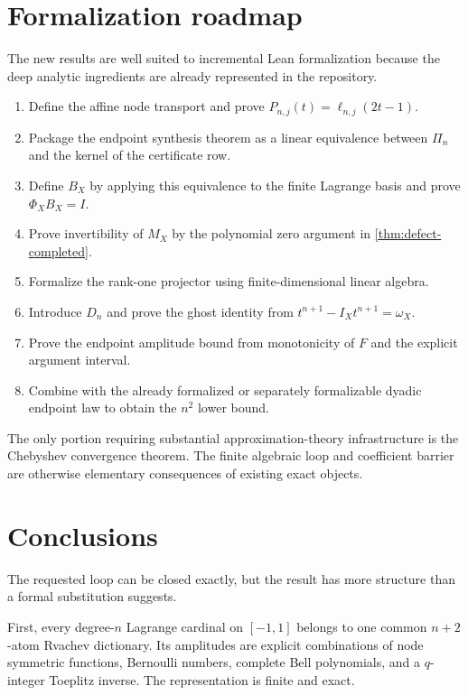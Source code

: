 \documentclass[11pt,oneside]{article}
\theoremstyle{definition}
\theoremstyle{remark}
\newcommand{\1}{\mathbf{1}}
\begin{document}
\section{Formalization roadmap}
\label{sec:formalization}

The new results are well suited to incremental Lean formalization because the
deep analytic ingredients are already represented in the repository.

\begin{enumerate}
\item Define the affine node transport and prove
$P_{n,j}(t)=\ell_{n,j}(2t-1)$.
\item Package the endpoint synthesis theorem as a linear equivalence between
$\Pi_n$ and the kernel of the certificate row.
\item Define $B_X$ by applying this equivalence to the finite Lagrange basis and
prove $\Phi_XB_X=I$.
\item Prove invertibility of $M_X$ by the polynomial zero argument in
\cref{thm:defect-completed}.
\item Formalize the rank-one projector using finite-dimensional linear
algebra.
\item Introduce $D_n$ and prove the ghost identity from
$t^{n+1}-I_Xt^{n+1}=\omega_X$.
\item Prove the endpoint amplitude bound from monotonicity of $F$ and the
explicit argument interval.
\item Combine with the already formalized or separately formalizable dyadic
endpoint law to obtain the $n^2$ lower bound.
\end{enumerate}

The only portion requiring substantial approximation-theory infrastructure is
the Chebyshev convergence theorem.  The finite algebraic loop and coefficient
barrier are otherwise elementary consequences of existing exact objects.

\section{Conclusions}

The requested loop can be closed exactly, but the result has more structure
than a formal substitution suggests.

First, every degree-$n$ Lagrange cardinal on $[-1,1]$ belongs to one common
$n+2$-atom Rvachev dictionary.  Its amplitudes are explicit combinations of
node symmetric functions, Bernoulli numbers, complete Bell polynomials, and a
$q$-integer Toeplitz inverse.  The representation is finite and exact.
\end{document}
